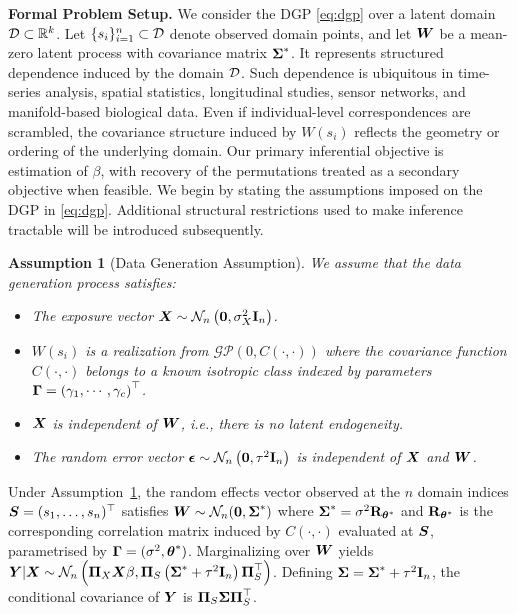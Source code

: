 \documentclass[numsec,webpdf,modern,medium,namedate]{oup-authoring-template}
\theoremstyle{thmstyleone}%
\newtheorem{assumption}{Assumption}%
\theoremstyle{thmstyletwo}%
\theoremstyle{thmstylethree}%
\begin{document}
\textbf{Formal Problem Setup.} We consider the DGP \eqref{eq:dgp} over a latent domain $\mathcal{D}\subset\mathbb{R}^k$. Let $\{s_i\}_{i=1}^n\subset\mathcal{D}$ denote observed domain points, and let $\boldsymbol{W}$ 
be a mean-zero latent process with covariance matrix $\boldsymbol{\Sigma}^\ast$. It represents structured dependence induced by the domain $\mathcal{D}$. Such dependence is ubiquitous in time-series analysis, spatial statistics, longitudinal studies, sensor networks, and manifold-based biological data. Even if individual-level correspondences are scrambled, the covariance structure induced by $W(s_i)$ reflects the geometry or ordering of the underlying domain. Our primary inferential objective is estimation of $\beta$, with recovery of the permutations treated as a secondary objective when feasible. We begin by stating the assumptions imposed on the DGP in \eqref{eq:dgp}. Additional structural restrictions used to make inference tractable will be introduced subsequently.
\begin{assumption}[Data Generation Assumption]\label{assume:dgp}
We assume that the data generation process satisfies:
\begin{itemize}
    \item The exposure vector $\boldsymbol{X} \sim \mathcal{N}_n\left(\boldsymbol{0}, \sigma_X^2 \mathbf{I}_n \right)$.
    \item $W(s_i)$ is a realization from $\mathcal{GP}(0, C(\cdot,\cdot))$ where the covariance function $C(\cdot,\cdot)$ belongs to a known isotropic class indexed by parameters $\boldsymbol{\Gamma} = \left(\gamma_1, \cdots, \gamma_c\right)^\top$.
    \item $\boldsymbol{X}$ is independent of $\boldsymbol{W}$, i.e., there is no latent endogeneity.
    \item The random error vector $\boldsymbol{\epsilon} \sim \mathcal{N}_n \left(\boldsymbol{0}, \tau^2 \mathbf{I}_n\right)$ is independent of $\boldsymbol{X}$ and $\boldsymbol{W}$.
\end{itemize}
\end{assumption}
Under Assumption~\ref{assume:dgp}, the random effects vector observed at the $n$ domain indices $\boldsymbol{S}=(s_1,\dots,s_n)^{\top}$ satisfies $\boldsymbol{W} \sim \mathcal{N}_n(\boldsymbol{0}, \boldsymbol{\Sigma}^\ast)$ where $\boldsymbol{\Sigma}^\ast = \sigma^2\mathbf{R}_{\boldsymbol{\theta}^\ast}$ and $\mathbf{R}_{\boldsymbol{\theta}^\ast}$ is the corresponding correlation matrix induced by $C(\cdot,\cdot)$ evaluated at $\boldsymbol{S}$, parametrised by $\boldsymbol{\Gamma} = (\sigma^2,\boldsymbol{\theta}^\ast)$. Marginalizing over $\boldsymbol{W}$ yields $\boldsymbol{Y}|\boldsymbol{X} \sim  \mathcal{N}_n\left(\boldsymbol{\Pi}_X\boldsymbol{X}\beta, \boldsymbol{\Pi}_S\left(\boldsymbol{\Sigma}^\ast + \tau^2 \mathbf{I}_n\right)\boldsymbol{\Pi}_S^\top\right)$. Defining $\boldsymbol{\Sigma} = \boldsymbol{\Sigma}^\ast + \tau^2 \mathbf{I}_n$, the conditional covariance of $\boldsymbol{Y}$ is $\boldsymbol{\Pi}_S\boldsymbol{\Sigma}\boldsymbol{\Pi}_S^\top$.
\end{document}
